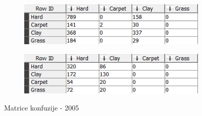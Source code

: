 \documentclass[a4paper]{article}
\begin{document}
\begin{figure}[H]
	\begin{subfigure}[h]{\textwidth}
		\begin{center}
			\includegraphics[scale=0.60]{Klasifikacija/DrvoOdlucivanja/2005/MatricaKonfuzijeTrening.png}
		\end{center}
		\label{fig:MatricaKnfuzijeTrening2005}
	\end{subfigure}

	\vspace{0.5cm}
	\begin{subfigure}[h]{\textwidth}
		\begin{center}
			\includegraphics[scale=0.60]{Klasifikacija/DrvoOdlucivanja/2005/MatricaKonfuzijeTest.png}
		\end{center}
		\label{fig:MatricaKnfuzijeTest2005}
	\end{subfigure}
	\caption{Matrice konfuzije - 2005}
	\label{fig:MatricaKnfuzije2005}
\end{figure}
\end{document}
